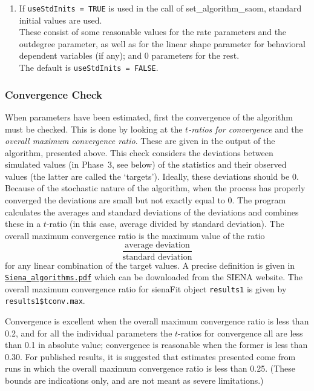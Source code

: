 \documentclass[a4paper,fleqn,11pt]{article}
\newcommand{\+}{\, + \,}
\newcommand{\sfn}[1]{\textsf{#1}}
\newcommand{\SI}{{\sf SIENA }}
\begin{document}
\begin{enumerate}
      If the specification of the effects object used to obtain
      \texttt{results0} was not the same as \texttt{myeff}, then for those
      parameters that do match, the initial values are copied
      from \texttt{results0} and Phase~1 is carried out as usual.
\item If \texttt{useStdInits = TRUE} is used in the call of
      \textsf{set\_algorithm\_saom}, standard initial values are used.\\
      These consist of some reasonable values for the rate parameters and the
      outdegree parameter, as well as for the linear shape parameter
      for behavioral dependent variables (if any);
      and 0 parameters for the rest.\\
      The default is  \texttt{useStdInits = FALSE}.
\end{enumerate}

\subsubsection{Convergence Check}
\label{S_ccheck}

When parameters have been estimated, first the
\hypertarget{T_convergence}{convergence} of the
algorithm must be checked. This is done by looking at the
\emph{$t$-ratios for convergence} and the
\emph{overall maximum convergence ratio}.
These are given in the output of the algorithm, presented above.
This check
considers the deviations between simulated values
(in Phase~3, see below) of the
statistics and their observed values (the latter are called the
`targets'). Ideally, these deviations should be 0. Because of the
stochastic nature of the algorithm, when the process has properly
converged the deviations are small but not exactly equal to 0.
The program calculates the averages and standard deviations of the
deviations and combines these in a $t$-ratio (in this case,
average divided by standard deviation).
The overall maximum convergence ratio is the maximum value of
the ratio
\[
 \frac{\text{average deviation}}{\text{standard deviation}}
\]
for any linear combination of the target values.
A precise definition is given in \\
\href{http://www.stats.ox.ac.uk/~snijders/siena/Siena_algorithms.pdf}{\texttt{Siena\_algorithms.pdf}}
which can be downloaded from the \SI website.
The overall maximum convergence ratio for \sfn{sienaFit} object \texttt{results1}
is given by  \texttt{results1\$tconv.max}.

Convergence is excellent when the overall maximum convergence ratio
is less than 0.2, and for all the individual parameters the $t$-ratios
for convergence all are less than 0.1 in absolute value;
convergence is reasonable when the former is less than 0.30.
For published results, it is suggested that estimates presented come from runs
in which the overall maximum convergence ratio is less than 0.25.
(These bounds are indications only, and are not meant as severe limitations.)
\end{document}
